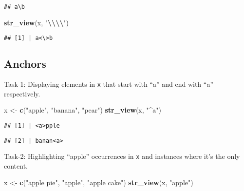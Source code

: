 \documentclass[
]{article}
\newenvironment{Shaded}{\begin{snugshade}}{\end{snugshade}}
\newcommand{\FunctionTok}[1]{\textcolor[rgb]{0.13,0.29,0.53}{\textbf{#1}}}
\newcommand{\NormalTok}[1]{#1}
\newcommand{\OtherTok}[1]{\textcolor[rgb]{0.56,0.35,0.01}{#1}}
\newcommand{\SpecialCharTok}[1]{\textcolor[rgb]{0.81,0.36,0.00}{\textbf{#1}}}
\newcommand{\StringTok}[1]{\textcolor[rgb]{0.31,0.60,0.02}{#1}}
\begin{document}
\begin{verbatim}
## a\b
\end{verbatim}

\begin{Shaded}
\begin{Highlighting}[]
\FunctionTok{str\_view}\NormalTok{(x, }\StringTok{"}\SpecialCharTok{\textbackslash{}\textbackslash{}\textbackslash{}\textbackslash{}}\StringTok{"}\NormalTok{)}
\end{Highlighting}
\end{Shaded}

\begin{verbatim}
## [1] | a<\>b
\end{verbatim}

\hypertarget{anchors}{%
\subsection{Anchors}\label{anchors}}

Task-1: Displaying elements in \texttt{x} that start with ``a'' and end
with ``a'' respectively.

\begin{Shaded}
\begin{Highlighting}[]
\NormalTok{x }\OtherTok{\textless{}{-}} \FunctionTok{c}\NormalTok{(}\StringTok{"apple"}\NormalTok{, }\StringTok{"banana"}\NormalTok{, }\StringTok{"pear"}\NormalTok{)}
\FunctionTok{str\_view}\NormalTok{(x, }\StringTok{"\^{}a"}\NormalTok{)}
\end{Highlighting}
\end{Shaded}

\begin{verbatim}
## [1] | <a>pple
\end{verbatim}

\begin{Shaded}
\end{Shaded}

\begin{verbatim}
## [2] | banan<a>
\end{verbatim}

Task-2: Highlighting ``apple'' occurrences in \texttt{x} and instances
where it's the only content.

\begin{Shaded}
\begin{Highlighting}[]
\NormalTok{x }\OtherTok{\textless{}{-}} \FunctionTok{c}\NormalTok{(}\StringTok{"apple pie"}\NormalTok{, }\StringTok{"apple"}\NormalTok{, }\StringTok{"apple cake"}\NormalTok{)}
\FunctionTok{str\_view}\NormalTok{(x, }\StringTok{"apple"}\NormalTok{)}
\end{Highlighting}
\end{Shaded}
\end{document}

